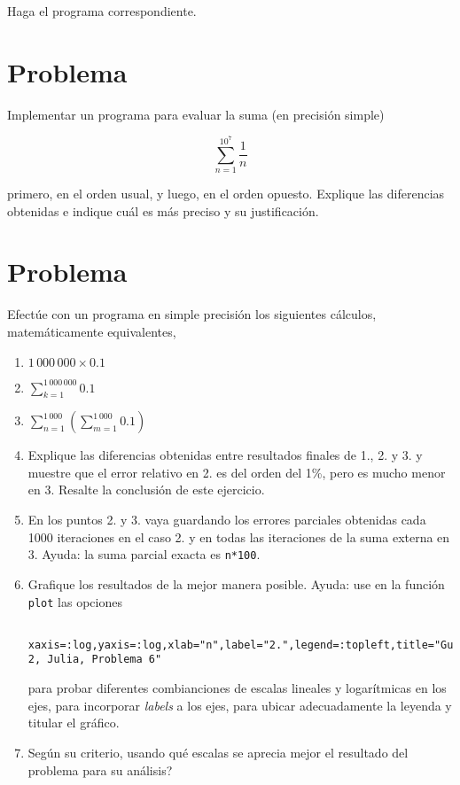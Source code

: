 \documentclass[11pt]{article}
\begin{document}
Haga el programa correspondiente.

    \hypertarget{problema}{%
\section{Problema}\label{problema}}

Implementar un programa para evaluar la suma (en precisi\'on simple)

\[
\sum_{n=1}^{10^7} \frac{1}{n}
\]

primero, en el orden usual, y luego, en el orden opuesto. Explique las
diferencias obtenidas e indique cu\'al es m\'as preciso y su justificaci\'on.

    \hypertarget{problema}{%
\section{Problema}\label{problema}}

Efect\'ue con un programa en simple precisi\'on los siguientes c\'alculos,
matem\'aticamente equivalentes,

\begin{enumerate}
\def\labelenumi{\arabic{enumi}.}
\item
  \(1\,000\,000 \times 0.1\)
\item
  \(\sum_{k=1}^{1\,000\,000} 0.1\)
\item
  \(\sum_{n=1}^{1\,000} \left( \sum_{m=1}^{1\,000} 0.1\right)\)
\item
  Explique las diferencias obtenidas entre resultados finales de 1., 2.
  y 3. y muestre que el error relativo en 2. es del orden del 1\%, pero
  es mucho menor en 3. Resalte la conclusi\'on de este ejercicio.
\item
  En los puntos 2. y 3. vaya guardando los errores parciales obtenidas
  cada 1000 iteraciones en el caso 2. y en todas las iteraciones de la
  suma externa en 3. Ayuda: la suma parcial exacta es \texttt{n*100}.
\item
  Grafique los resultados de la mejor manera posible. Ayuda: use en la
  funci\'on \texttt{plot} las opciones

\begin{verbatim}
 xaxis=:log,yaxis=:log,xlab="n",label="2.",legend=:topleft,title="Guia 2, Julia, Problema 6"
\end{verbatim}

  para probar diferentes combianciones de escalas lineales y
  logar\'itmicas en los ejes, para incorporar \emph{labels} a los ejes,
  para ubicar adecuadamente la leyenda y titular el gr\'afico.
\item
  Seg\'un su criterio, usando qu\'e escalas se aprecia mejor el resultado
  del problema para su an\'alisis?
\end{enumerate}
\end{document}
